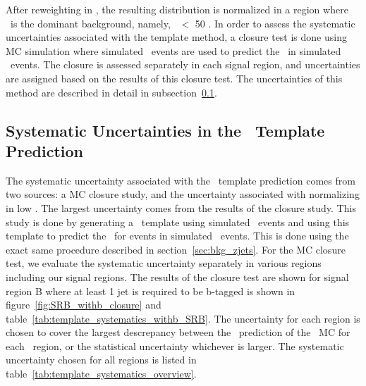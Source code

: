 After reweighting in \pt, the resulting \MET distribution is normalized in a region where \zjets\ is the dominant background, namely, \MET\ $<$ 50 \gev.
In order to assess the systematic uncertainties associated with the template method,
a closure test is done using MC simulation where simulated \gjets\ events are used to predict the \MET\ in simulated \zjets\ events.
The closure is assessed separately in each signal region, and uncertainties are assigned based on the results of this closure test.
The uncertainties of this method are described in detail in subsection~\ref{ssec:bkg_zjetssyst}.

\subsection{Systematic Uncertainties in the \texorpdfstring{\MET}{MET}\ Template Prediction}
\label{ssec:bkg_zjetssyst}

The systematic uncertainty associated with the \MET\ template prediction comes from two sources:
a MC closure study, and the uncertainty associated with normalizing in low \MET.
The largest uncertainty comes from the results of the closure study.
This study is done by generating a \MET\ template using simulated \gjets\ events and using this template to predict the \MET\ for events in simulated \zjets\ events.
This is done using the exact same procedure described in section~\ref{sec:bkg_zjets}.
For the MC closure test, we evaluate the systematic uncertainty separately in various regions including our signal regions.
The results of the closure test are shown for signal region B where at least 1 jet is required to be b-tagged is shown in figure~\ref{fig:SRB_withb_closure} and table~\ref{tab:template_systematics_withb_SRB}.
The uncertainty for each region is chosen to cover the largest descrepancy between the \gjets\ prediction of the \zjets\ MC for each \MET\ region,
or the statistical uncertainty whichever is larger. 
The systematic uncertainty chosen for all regions is listed in table~\ref{tab:template_systematics_overview}.

